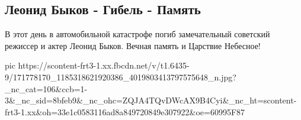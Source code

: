  
 
 
 
 

\subsection{Леонид Быков - Гибель - Память}

В этот день в автомобильной катастрофе погиб замечательный советский режиссер и
актер Леонид Быков.  Вечная память и Царствие Небесное!

\ifcmt
  pic https://scontent-frt3-1.xx.fbcdn.net/v/t1.6435-9/171778170_1185318621920386_4019803413797575648_n.jpg?_nc_cat=106&ccb=1-3&_nc_sid=8bfeb9&_nc_ohc=ZQJA4TQvDWcAX9B4Cyi&_nc_ht=scontent-frt3-1.xx&oh=33e1c0583116ad8a849720849e307922&oe=60995F87
\fi

